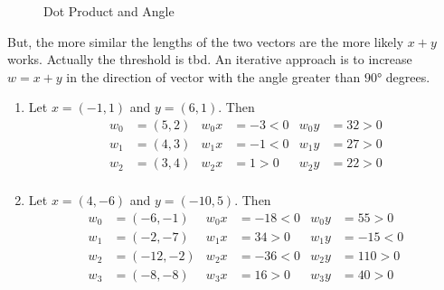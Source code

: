 \bigskip
\begin{figure}[H]
	\centering
	\plotvectorangle
	\caption{Dot Product and Angle}\label{fig:vectorangle}
\end{figure}
\bigskip

But, the more similar the lengths of the two vectors are the more likely \( x + y \) works. 
Actually the threshold is tbd.
An iterative approach is to increase \( w = x + y \) in the direction of vector with the angle greater 
than \( \ang{90} \) degrees.

\begin{examples}\hfill
    \begin{enumerate}
        \item Let \( x = (-1, 1) \) and \( y = (6, 1) \). Then 
			\[ 
				\begin{align*}
					w_0 &= (5, 2) & w_0x &= -3 < 0 & w_0y &= 32 > 0 \\
					w_1 &= (4, 3) & w_1x &= -1 < 0 & w_1y &= 27 > 0 \\
					w_2 &= (3, 4) & w_2x &= 1 > 0 & w_2y &= 22 > 0 \\
				\end{align*}
			\]
        \item Let \( x = (4, -6) \) and \( y = (-10, 5) \). Then 
			\[ 
				\begin{align*}
					w_0 &= (-6, -1) & w_0x &= -18 < 0 & w_0y &= 55 > 0 \\
					w_1 &= (-2, -7) & w_1x &= 34 > 0 & w_1y &= -15 < 0 \\
					w_2 &= (-12, -2) & w_2x &= -36 < 0 & w_2y &= 110 > 0 \\
					w_3 &= (-8, -8) & w_3x &= 16 > 0 & w_3y &= 40 > 0 \\
   				\end{align*}
			\]
    \end{enumerate}
\end{examples}
	

\begin{algorithm}[Weight]\label{algo:weight}
\end{algorithm}
\inputminted[fontsize=\small, framesep=0.35cm, frame=lines, python3=true]{python}{python/weight.py}
\bigskip



\begin{algorithm}[Perceptron]\label{algo:perceptron}
\end{algorithm}
\inputminted[fontsize=\small, framesep=0.35cm, frame=lines, python3=true]{python}{python/perceptron.py}
\bigskip


